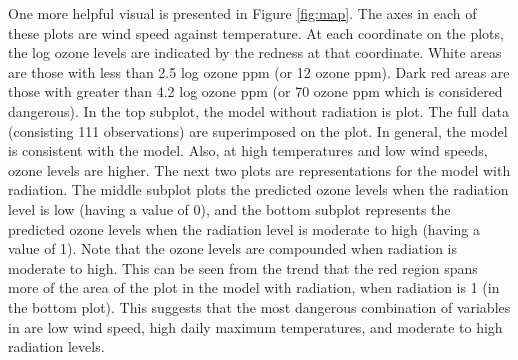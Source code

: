 \documentclass{../../tex_template/asaproc}
\newcommand{\M}{\mathcal{M}}
\begin{document}
One more helpful visual is presented in Figure \ref{fig:map}.  The axes in each
of these plots are wind speed against temperature. At each coordinate on the
plots, the log ozone levels are indicated by the redness at that coordinate.
White areas are those with less than 2.5 log ozone ppm (or 12 ozone ppm).  Dark
red areas are those with greater than 4.2 log ozone ppm (or 70 ozone ppm which
is considered dangerous). In the top subplot, the model without radiation is plot.
The full data (consisting 111 observations) are superimposed on the plot.
In general, the model is consistent with the model. Also, at high temperatures
and low wind speeds, ozone levels are higher. The next two plots are representations
for the model with radiation. The middle subplot plots the predicted ozone levels
when the radiation level is low (having a value of 0), and the
bottom subplot represents the predicted ozone levels when the radiation level is 
moderate to high (having a value of 1). Note that the ozone levels are compounded
when radiation is moderate to high. This can be seen from the trend that
the red region spans more of the area of the plot in the model with radiation,
when radiation is 1 (in the bottom plot). This suggests that the most dangerous
combination of variables in are low wind speed, high daily maximum
temperatures, and moderate to high radiation levels.


\end{document}
